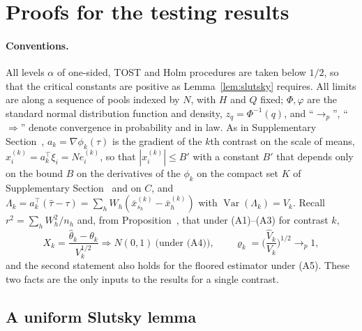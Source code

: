 \section{Proofs for the testing results}\label{si:testing}

\paragraph{Conventions.} All levels $\alpha$ of one-sided, TOST and Holm procedures are taken below $1/2$, so that the critical constants are positive as Lemma~\ref{lem:slutsky} requires. All limits are along a sequence of pools indexed by $N$, with $H$ and $Q$ fixed; $\Phi,\varphi$ are the standard normal distribution function and density, $z_q=\Phi^{-1}(q)$, and
``$\to_p$'', ``$\Rightarrow$'' denote convergence in probability and in law. As in Supplementary Section~, $a_k=\nabla\phi_k(\tau)$ is the gradient of the $k$th contrast on the scale of means, $x^{(k)}_i=a_k^\top\xi_i=Ne^{(k)}_i$, so that $|x^{(k)}_i|\le B'$ with a constant $B'$ that depends only on the bound $B$ on the derivatives of the $\phi_k$ on the compact set $K$ of Supplementary Section~ and on $C$, and
$\Lambda_k=a_k^\top(\hat\tau-\tau)=\sum_hW_h(\bar x^{(k)}_{s_h}-\bar x^{(k)}_h)$ with $\operatorname{Var}(\Lambda_k)=V_k$. Recall $r^2=\sum_hW_h^2/n_h$ and, from Proposition~, that under (A1)--(A3) for contrast $k$,
\begin{equation}\label{eq:si-ingredients}
X_k=\frac{\hat\theta_k-\theta_k}{V_k^{1/2}}\Rightarrow N(0,1)\ \text{(under (A4))},\qquad
\varrho_k=\Big(\frac{\hat V_k}{V_k}\Big)^{1/2}\to_p1,
\end{equation}
and the second statement also holds for the floored estimator under (A5). These two facts are the only inputs to the results for a single contrast.

\subsection{A uniform Slutsky lemma}\label{si:testing-slutsky}

